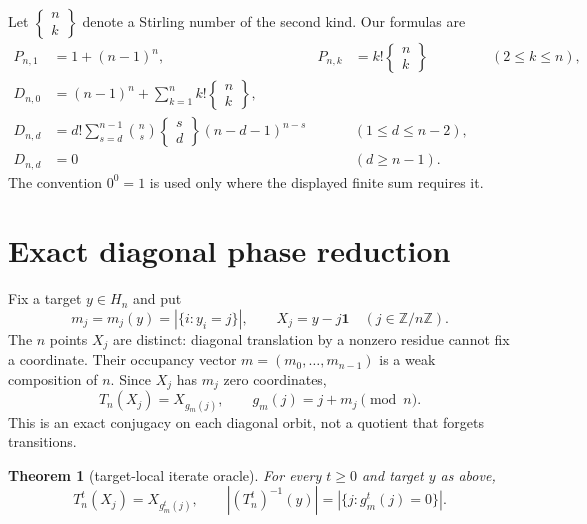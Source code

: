 \documentclass[a4paper,10pt]{amsart}
\newtheorem{theorem}{Theorem}
\theoremstyle{remark}
\newcommand{\Z}{\mathbb Z}
\newcommand{\one}{\mathbf 1}
\begin{document}
Let $\left\{\begin{smallmatrix}n\\k\end{smallmatrix}\right\}$ denote a
Stirling number of the second kind.  Our formulas are
\begin{align}
 P_{n,1}&=1+(n-1)^n,&
 P_{n,k}&=k!\left\{\begin{matrix}n\\k\end{matrix}\right\}
 &&(2\leq k\leq n),                                    \label{eq:period}\\
 D_{n,0}&=(n-1)^n+\sum_{k=1}^n
 k!\left\{\begin{matrix}n\\k\end{matrix}\right\},  \label{eq:rec}\\
 D_{n,d}&=d!\sum_{s=d}^{n-1}\binom ns
 \left\{\begin{matrix}s\\d\end{matrix}\right\}
 (n-d-1)^{n-s} &&(1\leq d\leq n-2),                   \label{eq:depth}\\
 D_{n,d}&=0 &&(d\geq n-1).
\end{align}
The convention $0^0=1$ is used only where the displayed finite sum
requires it.

\section{Exact diagonal phase reduction}

Fix a target $y\in H_n$ and put
\[
 m_j=m_j(y)=|\{i:y_i=j\}|,
 \qquad X_j=y-j\one \quad(j\in\Z/n\Z).
\]
The $n$ points $X_j$ are distinct: diagonal translation by a nonzero
residue cannot fix a coordinate.  Their occupancy vector
$m=(m_0,\ldots,m_{n-1})$ is a weak composition of $n$.  Since $X_j$ has
$m_j$ zero coordinates,
\begin{equation}\label{eq:phase}
 T_n(X_j)=X_{g_m(j)},\qquad g_m(j)=j+m_j\pmod n.
\end{equation}
This is an exact conjugacy on each diagonal orbit, not a quotient that
forgets transitions.

\begin{theorem}[target-local iterate oracle]\label{thm:oracle}
For every $t\geq0$ and target $y$ as above,
\begin{equation}\label{eq:oracle}
 T_n^t(X_j)=X_{g_m^t(j)},\qquad
 |(T_n^t)^{-1}(y)|=|\{j:g_m^t(j)=0\}|.
\end{equation}
\end{theorem}
\end{document}
